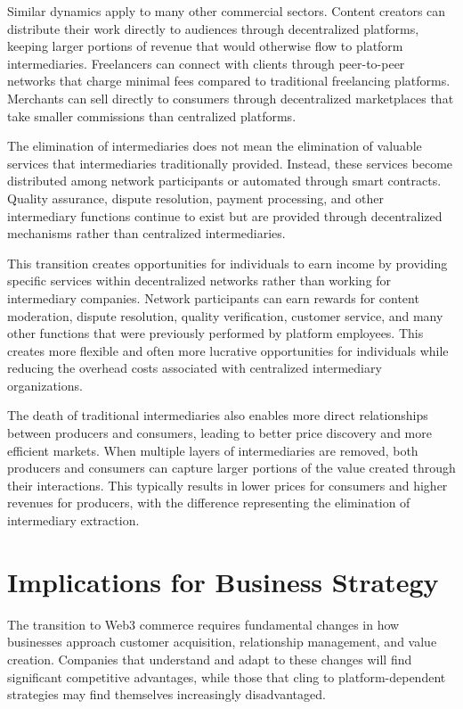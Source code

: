 \documentclass[
  Letterpaper,
]{scrbook}
\begin{document}
Similar dynamics apply to many other commercial sectors. Content
creators can distribute their work directly to audiences through
decentralized platforms, keeping larger portions of revenue that would
otherwise flow to platform intermediaries. Freelancers can connect with
clients through peer-to-peer networks that charge minimal fees compared
to traditional freelancing platforms. Merchants can sell directly to
consumers through decentralized marketplaces that take smaller
commissions than centralized platforms.

The elimination of intermediaries does not mean the elimination of
valuable services that intermediaries traditionally provided. Instead,
these services become distributed among network participants or
automated through smart contracts. Quality assurance, dispute
resolution, payment processing, and other intermediary functions
continue to exist but are provided through decentralized mechanisms
rather than centralized intermediaries.

This transition creates opportunities for individuals to earn income by
providing specific services within decentralized networks rather than
working for intermediary companies. Network participants can earn
rewards for content moderation, dispute resolution, quality
verification, customer service, and many other functions that were
previously performed by platform employees. This creates more flexible
and often more lucrative opportunities for individuals while reducing
the overhead costs associated with centralized intermediary
organizations.

The death of traditional intermediaries also enables more direct
relationships between producers and consumers, leading to better price
discovery and more efficient markets. When multiple layers of
intermediaries are removed, both producers and consumers can capture
larger portions of the value created through their interactions. This
typically results in lower prices for consumers and higher revenues for
producers, with the difference representing the elimination of
intermediary extraction.

\section{Implications for Business
Strategy}\label{implications-for-business-strategy}

The transition to Web3 commerce requires fundamental changes in how
businesses approach customer acquisition, relationship management, and
value creation. Companies that understand and adapt to these changes
will find significant competitive advantages, while those that cling to
platform-dependent strategies may find themselves increasingly
disadvantaged.
\end{document}
